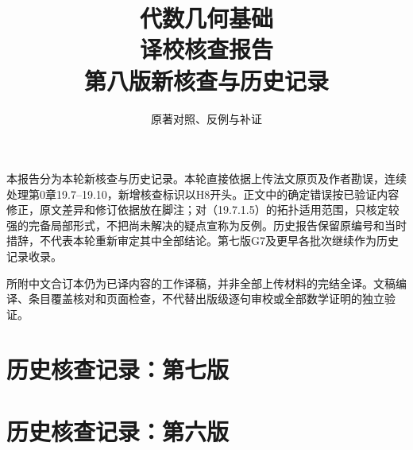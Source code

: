 
\newcommand{\RR}{\mathcal R}
\newcommand{\FF}{\mathcal F}
\newcommand{\GG}{\mathcal G}
\newcommand{\MM}{\mathcal M}
\newcommand{\JJ}{\mathcal J}
\newcommand{\oldauditsrc}[1]{\par\noindent\textbf{原文位置：}#1。\par}
\newcommand{\kind}[2]{\noindent\textbf{分类：#1。}\ #2\par}
\newcommand{\lead}[1]{\par\noindent\textbf{#1}\quad}
\newenvironment{analysisproof}{\par\noindent\textbf{该轮核查的反例或补证。}\ }{\par}

\title{代数几何基础\\译校核查报告\\[1em]\large 第八版新核查与历史记录}
\author{原著对照、反例与补证}
\date{}

\frontmatter
\maketitle
{}
本报告分为本轮新核查与历史记录。本轮直接依据上传法文原页及作者勘误，连续处理第0章19.7--19.10，新增核查标识以H8开头。正文中的确定错误按已验证内容修正，原文差异和修订依据放在脚注；对（19.7.1.5）的拓扑适用范围，只核定较强的完备局部形式，不把尚未解决的疑点宣称为反例。历史报告保留原编号和当时措辞，不代表本轮重新审定其中全部结论。第七版G7及更早各批次继续作为历史记录收录。

所附中文合订本仍为已译内容的工作译稿，并非全部上传材料的完结全译。文稿编译、条目覆盖核对和页面检查，不代替出版级逐句审校或全部数学证明的独立验证。
\tableofcontents
\mainmatter

\part*{历史核查记录：第七版}

\part*{历史核查记录：第六版}

